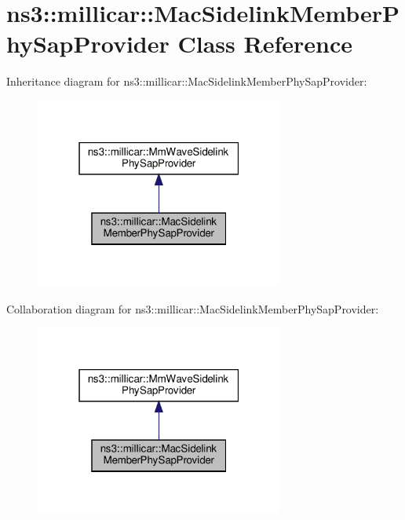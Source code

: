 \hypertarget{classns3_1_1millicar_1_1MacSidelinkMemberPhySapProvider}{}\section{ns3\+:\+:millicar\+:\+:Mac\+Sidelink\+Member\+Phy\+Sap\+Provider Class Reference}
\label{classns3_1_1millicar_1_1MacSidelinkMemberPhySapProvider}


Inheritance diagram for ns3\+:\+:millicar\+:\+:Mac\+Sidelink\+Member\+Phy\+Sap\+Provider\+:
\nopagebreak
\begin{figure}[H]
\begin{center}
\leavevmode
\includegraphics[width=232pt]{classns3_1_1millicar_1_1MacSidelinkMemberPhySapProvider__inherit__graph}
\end{center}
\end{figure}


Collaboration diagram for ns3\+:\+:millicar\+:\+:Mac\+Sidelink\+Member\+Phy\+Sap\+Provider\+:
\nopagebreak
\begin{figure}[H]
\begin{center}
\leavevmode
\includegraphics[width=232pt]{classns3_1_1millicar_1_1MacSidelinkMemberPhySapProvider__coll__graph}
\end{center}
\end{figure}
